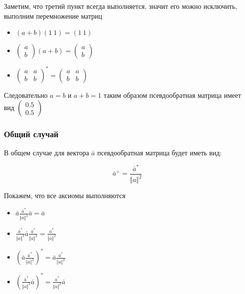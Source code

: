 \documentclass{article}
\begin{document}
    Заметим, что третий пункт всегда выполняется, значит его можно исключить, выполним перемножение матриц

    \begin{itemize}
        \item $(a + b) (1 \ 1) = (1 \ 1)$
        \item $\left(\begin{smallmatrix} a \\ b \end{smallmatrix}\right) (a + b) = \left(\begin{smallmatrix} a \\ b \end{smallmatrix}\right) $
        \item $ \left(\begin{smallmatrix} a & a \\ b & b \end{smallmatrix}\right)^{*} = \left(\begin{smallmatrix} a & a \\ b & b \end{smallmatrix}\right)$
    \end{itemize}

    Следовательно $a = b$ и $a + b = 1$ таким образом псевдообратная матрица имеет вид \(\left(\begin{smallmatrix} 0.5 \\ 0.5 \end{smallmatrix}\right)\)

    \subsubsection{Общий случай}

    В общем случае для вектора $\bar{a}$ псевдообратная матрица будет иметь вид:

    \begin{equation}
        \bar{a}^{+} = \frac{\bar{a}^{*}}{\Vert a \Vert^{2}}
    \end{equation}

    Покажем, что все аксиомы выполняются

    \begin{itemize}
        \item $  \bar{a} \frac{\bar{a}^{*}}{\Vert a \Vert^{2}} \bar{a}   =  \bar{a}$
        \item $\frac{\bar{a}^{*}}{\Vert a \Vert^{2}} \bar{a} \frac{\bar{a}^{*}}{\Vert a \Vert^{2}} = \frac{\bar{a}^{*}}{\Vert a \Vert^{2}}$
        \item $(\bar{a} \frac{\bar{a}^{*}}{\Vert a \Vert^{2}})^{*} = \bar{a} \frac{\bar{a}^{*}}{\Vert a \Vert^{2}}$
        \item $( \frac{\bar{a}^{*}}{\Vert a \Vert^{2}} \bar{a})^{*} = \frac{\bar{a}^{*}}{\Vert a \Vert^{2}} \bar{a}$
    \end{itemize}
\end{document}
